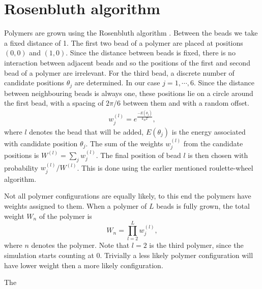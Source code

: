 \section{Rosenbluth algorithm}
Polymers are grown using the Rosenbluth algorithm \cite{rosenbluth1955monte}. Between the beads we take a fixed distance of 1. The first two bead of a polymer are placed at positions $(0,0)$ and $(1,0)$. Since the distance between beads is fixed, there is no interaction between adjacent beads and so the positions of the first and second bead of a polymer are irrelevant. For the third bead, a discrete number of candidate positions $\theta_j$ are determined. In our case $j=1,\cdots,6$. Since the distance between neighbouring beads is always one, these positions lie on a circle around the first bead, with a spacing of $2\pi/6$ between them and with a random offset. 
\begin{gather}
    w_j^{(l)} = e^\frac{-E(\theta_j)}{k_BT},
\end{gather} where $l$ denotes the bead that will be added, $E(\theta_j)$ is the energy associated with candidate position $\theta_j$. The sum of the weights $w_j^{(l)}$ from the candidate positions is $W^{(l)} = \sum_j w_j^{(l)}$. The final position of bead $l$ is then chosen with probability $w_j^{(l)}/W^{(l)}$. This is done using the earlier mentioned roulette-wheel algorithm. 

Not all polymer configurations are equally likely, to this end the polymers have weights assigned to them. When a polymer of $L$ beads is fully grown, the total weight $W_n$ of the polymer is 
\begin{equation}\label{eq:polymer_weight}
    W_n = \prod_{l=2}^L w_j^{(l)},
\end{equation} where $n$ denotes the polymer. Note that $l=2$ is the third polymer, since the simulation starts counting at $0$. Trivially a less likely polymer configuration will have lower weight then a more likely configuration.

The 

